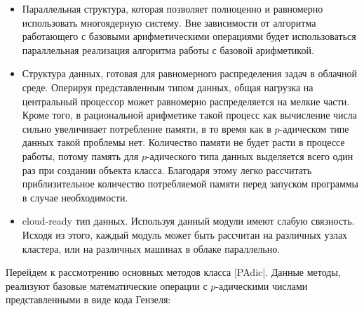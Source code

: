 \documentclass[master, och, diploma, times]{sty/SCWorks}
\theoremstyle{plain}
\theoremstyle{definition}
\numberwithin{equation}{section}
\begin{document}
\begin{itemize}
\item Параллельная структура, которая позволяет полноценно и равномерно использовать многоядерную систему. Вне зависимости от алгоритма работающего с базовыми арифметическими операциями будет использоваться параллельная реализация алгоритма работы с базовой арифметикой.
\item Структура данных, готовая для равномерного распределения задач в облачной среде. Оперируя представленным типом данных, общая нагрузка на центральный процессор может равномерно распределяется на мелкие части. Кроме того, в рациональной арифметике такой процесс как вычисление числа сильно увеличивает потребление памяти, в то время как в $p$-адическом типе данных такой проблемы нет. Количество памяти не будет расти в процессе работы, потому память для $p$-адического типа данных выделяется всего один раз при создании объекта класса. Благодаря этому легко рассчитать приблизительное количество потребляемой памяти перед запуском программы в случае необходимости.
\item cloud-ready тип данных. Используя данный модули имеют слабую связность. Исходя из этого, каждый модуль может быть рассчитан на различных узлах кластера, или на различных машинах в облаке параллельно.
\end{itemize}

Перейдем к рассмотрению основных методов класса |PAdic|. Данные методы, реализуют базовые математические операции с $p$-адическими числами представленными в виде кода Гензеля:
\end{document}
